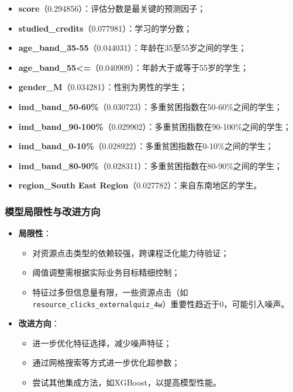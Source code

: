 \documentclass{SYSUReport}
\begin{document}
\begin{itemize}
    \item \textbf{score}（0.294856）：评估分数是最关键的预测因子；
    \item \textbf{studied\_credits}（0.077981）：学习的学分数；
    \item \textbf{age\_band\_35-55}（0.044031）：年龄在35至55岁之间的学生；
    \item \textbf{age\_band\_55<=}（0.040909）：年龄大于或等于55岁的学生；
    \item \textbf{gender\_M}（0.034281）：性别为男性的学生；
    \item \textbf{imd\_band\_50-60\%}（0.030723）：多重贫困指数在50-60\%之间的学生；
    \item \textbf{imd\_band\_90-100\%}（0.029902）：多重贫困指数在90-100\%之间的学生；
    \item \textbf{imd\_band\_0-10\%}（0.028922）：多重贫困指数在0-10\%之间的学生；
    \item \textbf{imd\_band\_80-90\%}（0.028311）：多重贫困指数在80-90\%之间的学生；
    \item \textbf{region\_South East Region}（0.027782）：来自东南地区的学生。
\end{itemize}

\subsubsection{模型局限性与改进方向}

\begin{itemize}
\item \textbf{局限性}：
\begin{itemize}
\item 对资源点击类型的依赖较强，跨课程泛化能力待验证；
\item 阈值调整需根据实际业务目标精细控制；
\item 特征过多但信息量有限，一些资源点击（如 \texttt{resource_clicks_externalquiz_4w}）重要性趋近于0，可能引入噪声。
\end{itemize}

\item \textbf{改进方向}：
\begin{itemize}
\item 进一步优化特征选择，减少噪声特征；
\item 通过网格搜索等方式进一步优化超参数；
\item 尝试其他集成方法，如XGBoost，以提高模型性能。
\end{itemize}
\end{itemize}
\end{document}

